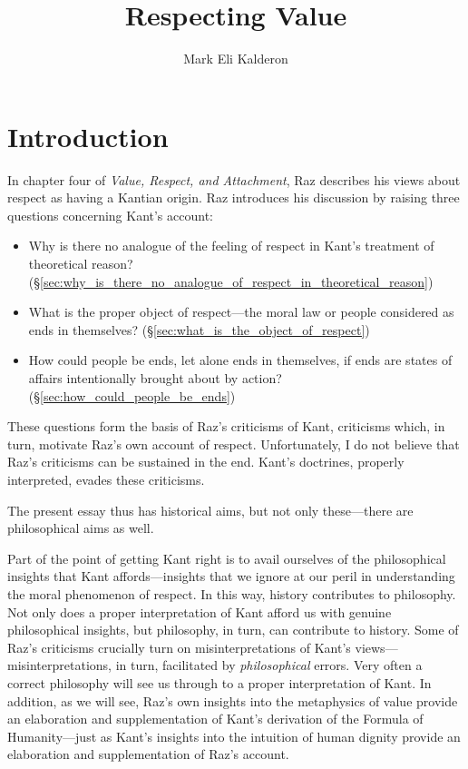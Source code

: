 \documentclass[a4paper,12pt]{article}
\title{Respecting Value} %
\author{Mark Eli Kalderon}
\begin{document}
\maketitle


\section{Introduction} \label{sec:introduction} %

In chapter four of \emph{Value, Respect, and Attachment}, Raz \citeyearpar{Raz:2001ps} describes his views about respect as having a Kantian origin. Raz introduces his discussion by raising three questions concerning Kant's account: 
\begin{itemize}
	\item Why is there no analogue of the feeling of respect in Kant's treatment of theoretical reason? (\S\ref{sec:why_is_there_no_analogue_of_respect_in_theoretical_reason}) 
	\item What is the proper object of respect---the moral law or people considered as ends in themselves? (\S\ref{sec:what_is_the_object_of_respect}) 
	\item How could people be ends, let alone ends in themselves, if ends are states of affairs intentionally brought about by action? (\S\ref{sec:how_could_people_be_ends}) 
\end{itemize}
These questions form the basis of Raz's criticisms of Kant, criticisms which, in turn, motivate Raz's own account of respect. Unfortunately, I do not believe that Raz's criticisms can be sustained in the end. Kant's doctrines, properly interpreted, evades these criticisms. 

The present essay thus has historical aims, but not only these---there are  philosophical aims as well. 

Part of the point of getting Kant right is to avail ourselves of the philosophical insights that Kant affords---insights that we ignore at our peril in understanding the moral phenomenon of respect. In this way, history contributes to philosophy. Not only does a proper interpretation of Kant afford us with genuine philosophical insights, but philosophy, in turn, can contribute to history. Some of Raz's criticisms crucially turn on misinterpretations of Kant's views---misinterpretations, in turn, facilitated by \emph{philosophical} errors. Very often a correct philosophy will see us through to a proper interpretation of Kant. In addition, as we will see, Raz's own insights into the metaphysics of value provide an elaboration and supplementation of Kant's derivation of the Formula of Humanity---just as Kant's insights into the intuition of human dignity provide an elaboration and supplementation of Raz's account.
\end{document}
